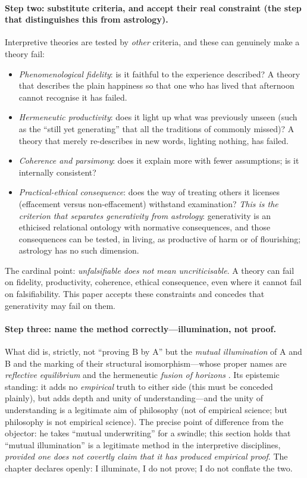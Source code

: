 \paragraph{Step two: substitute criteria, and accept their real constraint (the step that distinguishes this from astrology).} Interpretive theories are tested by \emph{other} criteria, and these can genuinely make a theory fail:
\begin{itemize}
  \item \emph{Phenomenological fidelity}: is it faithful to the experience described? A theory that describes the plain happiness so that one who has lived that afternoon cannot recognise it has failed.
  \item \emph{Hermeneutic productivity}: does it light up what was previously unseen (such as the ``still yet generating'' that all the traditions of  commonly missed)? A theory that merely re-describes in new words, lighting nothing, has failed.
  \item \emph{Coherence and parsimony}: does it explain more with fewer assumptions; is it internally consistent?
  \item \emph{Practical-ethical consequence}: does the way of treating others it licenses (effacement versus non-effacement) withstand examination? \emph{This is the criterion that separates generativity from astrology}: generativity is an ethicised relational ontology with normative consequences, and those consequences can be tested, in living, as productive of harm or of flourishing; astrology has no such dimension.
\end{itemize}
The cardinal point: \emph{unfalsifiable does not mean uncriticisable}. A theory can fail on fidelity, productivity, coherence, ethical consequence, even where it cannot fail on falsifiability. This paper accepts these constraints and concedes that generativity may fail on them.

\paragraph{Step three: name the method correctly---illumination, not proof.} What  did is, strictly, not ``proving B by A'' but the \emph{mutual illumination} of A and B and the marking of their structural isomorphism---whose proper names are \emph{reflective equilibrium} \parencite{rawls1971} and the hermeneutic \emph{fusion of horizons} \parencite{gadamer2004}. Its epistemic standing: it adds no \emph{empirical} truth to either side (this must be conceded plainly), but adds depth and unity of understanding---and the unity of understanding is a legitimate aim of philosophy (not of empirical science; but philosophy is not empirical science). The precise point of difference from the objector: he takes ``mutual underwriting'' for a swindle; this section holds that ``mutual illumination'' is a legitimate method in the interpretive disciplines, \emph{provided one does not covertly claim that it has produced empirical proof}. The chapter declares openly: I illuminate, I do not prove; I do not conflate the two.

